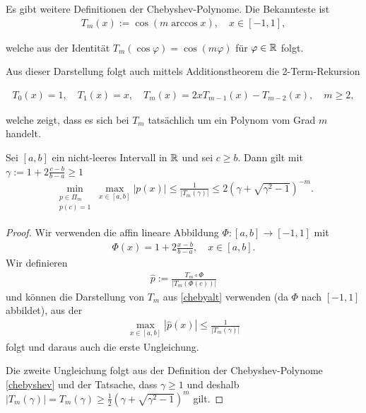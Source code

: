 \documentclass{article}
\begin{document}
Es gibt weitere Definitionen der Chebyshev-Polynome. Die Bekannteste ist
\begin{align}\label{chebyalt}
	T_m(x) := \cos(m \arccos x), \quad x \in [-1,1],
\end{align}

welche aus der Identität $T_m(\cos \varphi) = \cos (m \varphi)$ für $\varphi \in \mathbb{R}$ folgt.

Aus dieser Darstellung folgt auch mittels Additionstheorem die 2-Term-Rekursion

\begin{align*}
	T_0(x) = 1, \quad T_1(x) = x, \quad T_{m}(x) = 2x T_{m-1}(x) - T_{m-2}(x), \quad m \geq 2,
\end{align*}

welche zeigt, dass es sich bei $T_m$ tatsächlich um ein Polynom vom Grad $m$ handelt.

\begin{lemma}
	\label{lem:polminmax}
	Sei $[a,b]$ ein nicht-leeres Intervall in $\mathbb{R}$ und sei $c \geq b$. Dann gilt mit $\gamma := 1 + 2 \frac{c-b}{b-a} \geq 1$
	\begin{align}\label{polminmax}
		\min_{\substack{p \in \Pi_m \\
		p(c) = 1}} \max_{x \in [a,b]} |p(x)| \leq \frac{1}{|T_m(\gamma)|} \leq 2 (\gamma + \sqrt{\gamma^2 -1})^{-m}.
	\end{align}
\end{lemma}

\begin{proof}
	Wir verwenden die affin lineare Abbildung $\Phi: [a,b] \to [-1,1]$ mit
	\begin{align*}
		\Phi(x) = 1 + 2 \frac{x-b}{b-a}, \quad x \in [a,b].
	\end{align*}
	Wir definieren
	\begin{align*}
		\hat{p} := \frac{T_m \circ \Phi}{|T_m(\Phi(c))|}
	\end{align*}
	und können die Darstellung von $T_m$ aus \ref{chebyalt} verwenden (da $\Phi$ nach $[-1,1]$ abbildet), aus der
	\begin{align*}
		\max_{x \in [a,b]}|\hat{p}(x)| \leq \frac{1}{|T_m(\gamma)|}
	\end{align*}
	folgt und daraus auch die erste Ungleichung.

	Die zweite Ungleichung folgt aus der Definition der Chebyshev-Polynome \ref{chebyshev} und der Tatsache, dass $\gamma \geq 1$ und deshalb $|T_m(\gamma)| = T_m(\gamma) \geq \frac{1}{2} (\gamma+ \sqrt{\gamma^2-1})^m$ gilt.
\end{proof}
\end{document}
